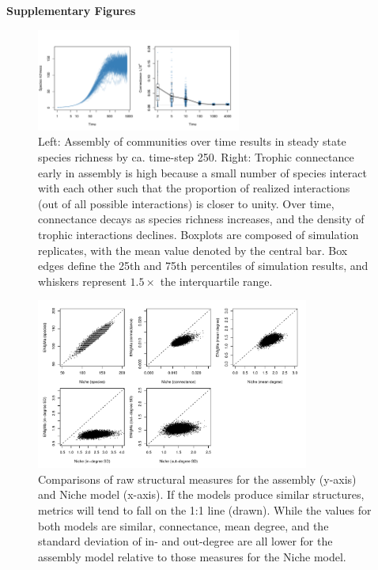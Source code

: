 \documentclass[onecolumn,preprintnumbers,amsmath,amssymb,superscriptaddress]{revtex4-1}
\begin{document}
\begin{bibunit}
\noindent \textbf{Supplementary Figures}\\

\begin{figure}[h!]
\centering
\includegraphics[width=0.6\textwidth]{fig_conn.pdf}
\caption{
Left: Assembly of communities over time results in steady state species richness by ca. time-step 250.
Right: Trophic connectance early in assembly is high because a small number of species interact with each other such that the proportion of realized interactions (out of all possible interactions) is closer to unity.
Over time, connectance decays as species richness increases, and the density of trophic interactions declines.
Boxplots are composed of simulation replicates, with the mean value denoted by the central bar.
Box edges define the 25th and 75th percentiles of simulation results, and whiskers represent $1.5\times$ the interquartile range.
}
\label{fig:conn}
\end{figure}



\begin{figure}[h!]
\centering
\includegraphics[width=0.8\textwidth]{fig_errorscatter2.pdf}
\caption{
Comparisons of raw structural measures for the assembly (y-axis) and Niche model (x-axis).
If the models produce similar structures, metrics will tend to fall on the 1:1 line (drawn).
While the values for both models are similar, connectance, mean degree, and the standard deviation of in- and out-degree are all lower for the assembly model relative to those measures for the Niche model.
}
\label{fig:error1}
\end{figure}


\end{bibunit}
\end{document}
